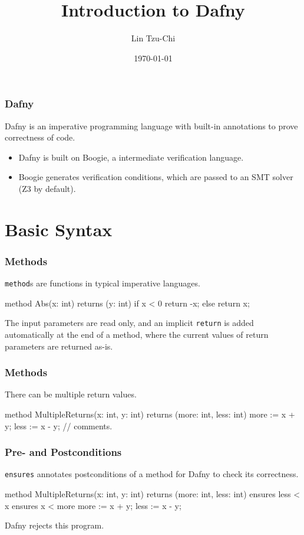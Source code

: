 \documentclass[10pt, compress]{beamer}
\title{Introduction to Dafny}
\subtitle{}
\date{\today}
\author{Lin Tzu-Chi}
\begin{document}
\maketitle

\begin{frame}[fragile]
  \frametitle{Dafny}

  Dafny is an imperative programming language with built-in annotations to prove correctness of code.
  \begin{itemize}
  \item Dafny is built on Boogie, a intermediate verification language.
  \item Boogie generates verification conditions, which are passed to an SMT solver (Z3 by default).
  \end{itemize}
  
\end{frame}

\section{Basic Syntax}

\begin{frame}[fragile]
  \frametitle{Methods}
  
  \verb|method|s are functions in typical imperative languages.
  
  \begin{verbnobox}[\footnotesize]
method Abs(x: int) returns (y: int)
{
   if x < 0
     { return -x; }
   else
     { return x; }
}
  \end{verbnobox}
  The input parameters are read only, and an implicit \verb|return| is added automatically at the end of a method, where the current values of return parameters are returned as-is.
\end{frame}

\begin{frame}[fragile]
  \frametitle{Methods}
  
  There can be multiple return values.
  \begin{verbnobox}[\footnotesize]
method MultipleReturns(x: int, y: int)
returns (more: int, less: int)
{
   more := x + y;
   less := x - y;
   // comments.
}
  \end{verbnobox}
\end{frame}

\begin{frame}[fragile]
  \frametitle{Pre- and Postconditions}
  \verb|ensures| annotates postconditions of a method for Dafny to check its correctness. 
  \begin{verbnobox}[\footnotesize]
method MultipleReturns(x: int, y: int)
returns (more: int, less: int)
   ensures less < x
   ensures x < more
{
   more := x + y;
   less := x - y;
}
  \end{verbnobox}	
  
Dafny rejects this program.
\end{frame}
\end{document}
